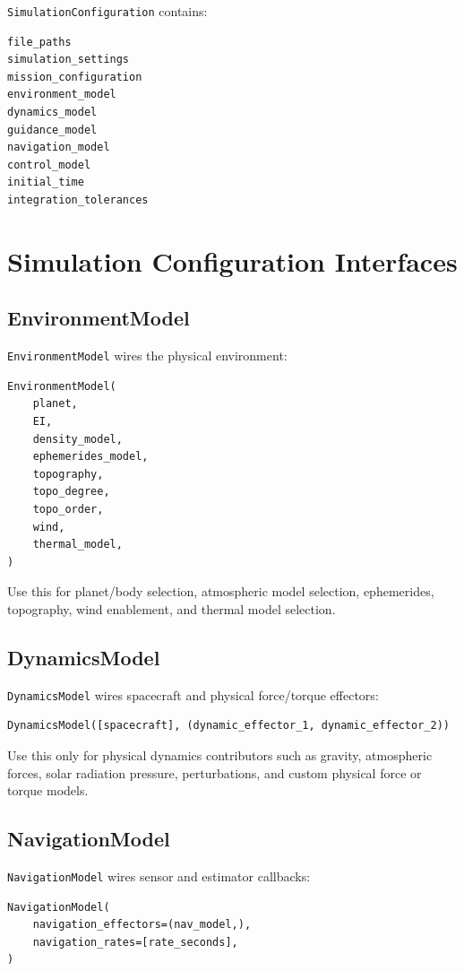 \documentclass[11pt]{article}
\begin{document}
\texttt{SimulationConfiguration} contains:

\begin{lstlisting}
file_paths
simulation_settings
mission_configuration
environment_model
dynamics_model
guidance_model
navigation_model
control_model
initial_time
integration_tolerances
\end{lstlisting}

\section{Simulation Configuration Interfaces}

\subsection{EnvironmentModel}

\texttt{EnvironmentModel} wires the physical environment:

\begin{lstlisting}
EnvironmentModel(
    planet,
    EI,
    density_model,
    ephemerides_model,
    topography,
    topo_degree,
    topo_order,
    wind,
    thermal_model,
)
\end{lstlisting}

Use this for planet/body selection, atmospheric model selection, ephemerides,
topography, wind enablement, and thermal model selection.

\subsection{DynamicsModel}

\texttt{DynamicsModel} wires spacecraft and physical force/torque effectors:

\begin{lstlisting}
DynamicsModel([spacecraft], (dynamic_effector_1, dynamic_effector_2))
\end{lstlisting}

Use this only for physical dynamics contributors such as gravity, atmospheric
forces, solar radiation pressure, perturbations, and custom physical force or
torque models.

\subsection{NavigationModel}

\texttt{NavigationModel} wires sensor and estimator callbacks:

\begin{lstlisting}
NavigationModel(
    navigation_effectors=(nav_model,),
    navigation_rates=[rate_seconds],
)
\end{lstlisting}
\end{document}
